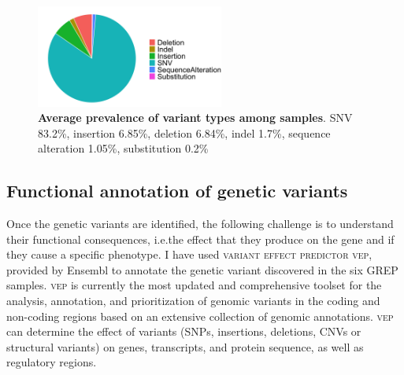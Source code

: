 \vspace{1.5cm}

\begin{figure}[H]
\centering
\includegraphics[width=0.55\textwidth]{fig/PieVariantClass.png}
\decoRule
\caption{\textbf{Average prevalence of variant types among samples}. SNV 83.2\%, insertion 6.85\%, deletion 6.84\%, indel 1.7\%, sequence alteration 1.05\%, substitution 0.2\%}
\label{fig:percentVariantClass}
\end{figure}



\subsection{Functional annotation of genetic variants}

Once the genetic variants are identified, the following challenge is to understand their functional consequences, i.e.the effect that they produce on the gene and if they cause a specific phenotype. I have used \textsc{variant effect predictor} \textsc{vep}, \cite{mclaren2016ensembl} provided by Ensembl \cite{howe2020ensembl} to annotate the genetic variant discovered in the six GREP samples. \textsc{vep} is currently the most updated and comprehensive toolset for the analysis, annotation, and prioritization of genomic variants in the coding and non-coding regions based on an extensive collection of genomic annotations. \textsc{vep} can determine the effect of variants (SNPs, insertions, deletions, CNVs or structural variants) on genes, transcripts, and protein sequence, as well as regulatory regions.\newline

